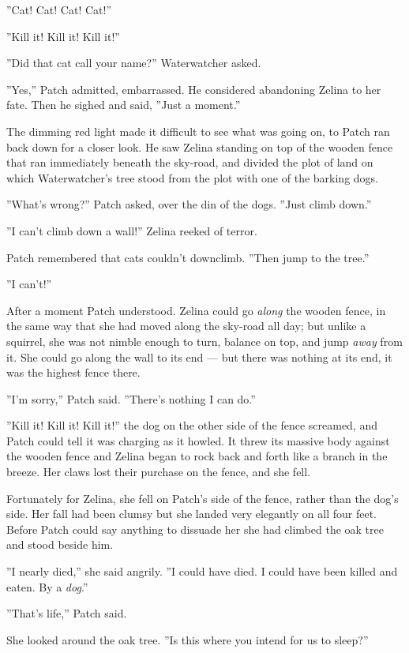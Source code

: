 \documentclass[12pt]{book}
\begin{document}
''Cat! Cat! Cat! Cat!''

''Kill it! Kill it! Kill it!''

''Did that cat call your name?'' Waterwatcher asked.

''Yes,'' Patch admitted, embarrassed. He considered abandoning Zelina to her fate. Then he sighed and said, ''Just a moment.''

The dimming red light made it difficult to see what was going on, to Patch ran back down for a closer look. He saw Zelina standing on top of the wooden fence that ran immediately beneath the sky-road, and divided the plot of land on which Waterwatcher's tree stood from the plot with one of the barking dogs.

''What's wrong?'' Patch asked, over the din of the dogs. ''Just climb down.''

''I can't climb down a wall!'' Zelina reeked of terror.

Patch remembered that cats couldn't downclimb. ''Then jump to the tree.''

''I can't!''

After a moment Patch understood. Zelina could go {\it along} the wooden fence, in the same way that she had moved along the sky-road all day; but unlike a squirrel, she was not nimble enough to turn, balance on top, and jump {\it away} from it. She could go along the wall to its end ---
but there was nothing at its end, it was the highest fence there.

''I'm sorry,'' Patch said. ''There's nothing I can do.''

''Kill it! Kill it! Kill it!'' the dog on the other side of the fence screamed, and Patch could tell it was charging as it howled. It threw its massive body against the wooden fence and Zelina began to rock back and forth like a branch in the breeze. Her claws lost their purchase on the fence, and she fell.

Fortunately for Zelina, she fell on Patch's side of the fence, rather than the dog's side. Her fall had been clumsy but she landed very elegantly on all four feet. Before Patch could say anything to dissuade her she had climbed the oak tree and stood beside him.

''I nearly died,'' she said angrily. ''I could have died. I could have been killed and eaten. By a {\it dog}.''

''That's life,'' Patch said.

She looked around the oak tree. ''Is this where you intend for us to sleep?''
\end{document}
